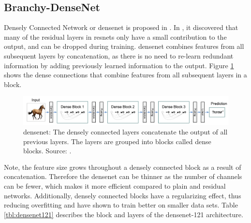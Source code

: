 \subsection{Branchy-DenseNet}

Densely Connected Network or \gls{densenet} is proposed in \cite{huang_densely_2016}. In \cite{huang_densely_2016}, it discovered that many of the residual layers in \gls{resnet}s only have a small contribution to the output, and can be dropped during training. \gls{densenet} combines features from all subsequent layers by concatenation, as there is no need to re-learn redundant information by adding previously learned information to the output. Figure \ref{fig:densenet} shows the dense connections that combine features from all subsequent layers in a block. 

\begin{figure}
	\centering
	\includegraphics[width=\linewidth]{figures/models/densenet}
	\caption[\gls{densenet}]{\gls{densenet}: The densely connected layers concatenate the output of all previous layers. The layers are grouped into blocks called dense blocks. Source:  \cite{huang_densely_2016}.}
	\label{fig:densenet}
\end{figure}
 
Note, the feature size grows throughout a densely connected block as a result of concatenation. Therefore the \gls{densenet} can be thinner as the number of channels can be fewer, which makes it more efficient compared to plain and residual networks. Additionally, densely connected blocks have a regularizing effect, thus reducing overfitting and have shown to train better on smaller data sets. Table \ref{tbl:densenet121} describes the block and layers of the \gls{densenet}-121 architecture.

